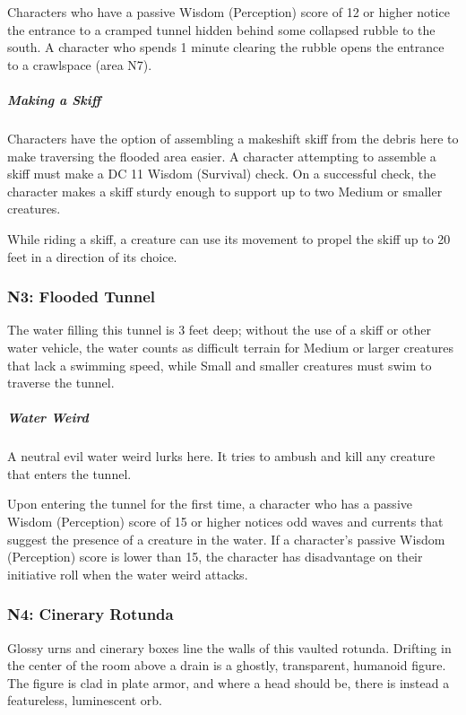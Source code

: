 \documentclass[10pt,a4paper,twoside,bg=print,twocolumn,openany,nodeprecatedcode]{dndbook}
\begin{document}
Characters who have a passive Wisdom (Perception) score of 12 or higher notice the entrance to a cramped tunnel hidden behind some collapsed rubble to the south. A character who spends 1 minute clearing the rubble opens the entrance to a crawlspace (area N7).

\subparagraph{Making a Skiff}
Characters have the option of assembling a makeshift skiff from the debris here to make traversing the flooded area easier. A character attempting to assemble a skiff must make a DC 11 Wisdom (Survival) check. On a successful check, the character makes a skiff sturdy enough to support up to two Medium or smaller creatures.

While riding a skiff, a creature can use its movement to propel the skiff up to 20 feet in a direction of its choice.

\subsubsection{N3: Flooded Tunnel}
The water filling this tunnel is 3 feet deep; without the use of a skiff or other water vehicle, the water counts as difficult terrain for Medium or larger creatures that lack a swimming speed, while Small and smaller creatures must swim to traverse the tunnel.

\subparagraph{Water Weird}
A neutral evil water weird lurks here. It tries to ambush and kill any creature that enters the tunnel.

Upon entering the tunnel for the first time, a character who has a passive Wisdom (Perception) score of 15 or higher notices odd waves and currents that suggest the presence of a creature in the water. If a character's passive Wisdom (Perception) score is lower than 15, the character has disadvantage on their initiative roll when the water weird attacks.

\subsubsection{N4: Cinerary Rotunda}

\begin{DndReadAloud}{}
Glossy urns and cinerary boxes line the walls of this vaulted rotunda. Drifting in the center of the room above a drain is a ghostly, transparent, humanoid figure. The figure is clad in plate armor, and where a head should be, there is instead a featureless, luminescent orb.
\end{DndReadAloud}
\end{document}

